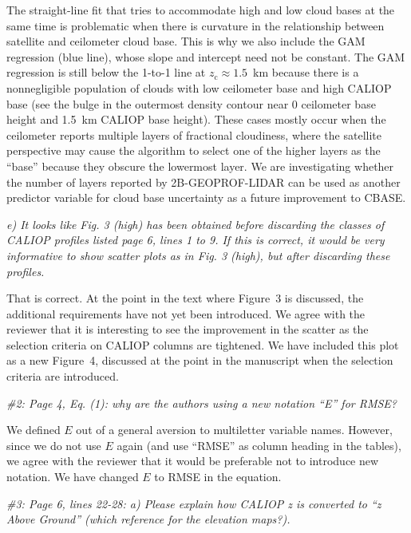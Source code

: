 \documentclass[12pt,a4paper]{responses}
\begin{document}
The straight-line fit that tries to accommodate high and low cloud bases at the
same time is problematic when there is curvature in the relationship between
satellite and ceilometer cloud base.  This is why we also include the GAM
regression (blue line), whose slope and intercept need not be constant.  The GAM
regression is still below the 1-to-1 line at $z_\text{c} \approx 1.5$~km because
there is a nonnegligible population of clouds with low ceilometer base and high
CALIOP base (see the bulge in the outermost density contour near 0 ceilometer
base height and 1.5~km CALIOP base height).  These cases mostly occur when the
ceilometer reports multiple layers of fractional cloudiness, where the satellite
perspective may cause the algorithm to select one of the higher layers as the
``base'' because they obscure the lowermost layer.  We are investigating whether
the number of layers reported by 2B-GEOPROF-LIDAR can be used as another
predictor variable for cloud base uncertainty as a future improvement to CBASE.

\textit{e) It looks like Fig.  3 (high) has been obtained before discarding the
  classes of CALIOP profiles listed page 6, lines 1 to 9.  If this is correct,
  it would be very informative to show scatter plots as in Fig. 3 (high), but
  after discarding these profiles.}

That is correct.  At the point in the text where Figure~3 is discussed, the
additional requirements have not yet been introduced.  We agree with the
reviewer that it is interesting to see the improvement in the scatter as the
selection criteria on CALIOP columns are tightened.  We have included this plot
as a new Figure~4, discussed at the point in the manuscript when the selection
criteria are introduced.

\textit{\#2: Page 4, Eq. (1): why are the authors using a new notation “E” for
  RMSE?}

We defined $E$ out of a general aversion to multiletter variable names.
However, since we do not use $E$ again (and use ``RMSE'' as column heading in
the tables), we agree with the reviewer that it would be preferable not to
introduce new notation.  We have changed $E$ to RMSE in the equation.

\textit{\#3:  Page 6, lines 22-28:  a) Please explain how CALIOP z is converted to “z Above
Ground” (which reference for the elevation maps?).}
\end{document}
